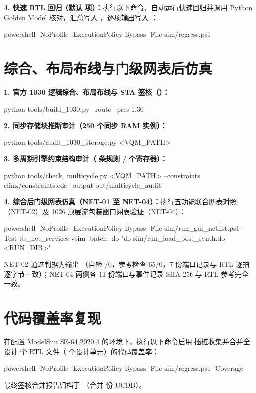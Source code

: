 \textbf{4. 快速 RTL 回归（默认 \RegFastCount{} 项）：}执行以下命令，自动运行快速回归并调用 Python Golden Model 核对，汇总写入 ，逐项输出写入 ：
\begin{runcommand}
powershell -NoProfile -ExecutionPolicy Bypass -File sim/regress.ps1
\end{runcommand}

\section{综合、布局布线与门级网表后仿真}\label{sec:repro-netlist}

\textbf{1. 官方 1030 逻辑综合、布局布线与 STA 签核（）：}
\begin{runcommand}
python tools/build_1030.py --route --pres 1.30
\end{runcommand}

\textbf{2. 同步存储块推断审计（250 个同步 RAM 实例）：}
\begin{runcommand}
python tools/audit_1030_storage.py <VQM_PATH>
\end{runcommand}

\textbf{3. 多周期引擎约束结构审计（\MulticycleRules{} 条规则 / \countsep{\MulticycleRegs} 个寄存器）：}
\begin{runcommand}
python tools/check_multicycle.py <VQM_PATH> --constraints elinx/constraints.edc --output out/multicycle_audit
\end{runcommand}

\textbf{4. 综合后门级网表仿真（NET-01 至 NET-04）：}执行五功能联合网表对照（NET-02）及 1026 顶层流包装窗口网表验证（NET-04）：
\begin{runcommand}
powershell -NoProfile -ExecutionPolicy Bypass -File sim/run_gui_netlist.ps1 -Test tb_net_services
vsim -batch -do "do sim/run_load_post_synth.do <RUN_DIR>"
\end{runcommand}
NET-02 通过判据为输出 （自检 \SvcChecks/0，参考检查 65/0，7 份端口记录与 RTL 逐拍逐字节一致）；NET-04 两侧各 11 份端口与事件记录 SHA-256 与 RTL 参考完全一致。

\section{代码覆盖率复现}
在配置 ModelSim SE-64 2020.4 的环境下，执行以下命令启用  插桩收集并合并全设计 \RtlFileCount{} 个 RTL 文件（\DesignUnitCount{} 个设计单元）的代码覆盖率：
\begin{runcommand}
powershell -NoProfile -ExecutionPolicy Bypass -File sim/regress.ps1 -Coverage
\end{runcommand}
最终签核合并报告归档于 （合并 \CovUcdbCount{} 份 UCDB）。

